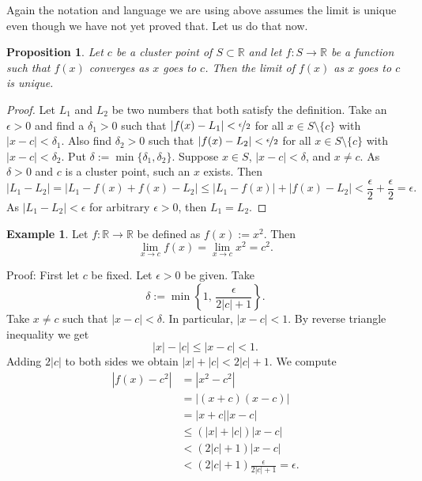 \documentclass[12pt]{book}
\newcommand{\abs}[1]{\left\lvert {#1} \right\rvert}
\newcommand{\R}{{\mathbb{R}}}
\theoremstyle{plain}
\newtheorem{prop}[thm]{Proposition}
\theoremstyle{remark}
\theoremstyle{definition}
\theoremstyle{exercise}
\theoremstyle{example}
\newtheorem{example}[thm]{Example}
\begin{document}
Again the notation and language we are using above assumes the limit
is unique even though we have not yet proved that.
Let us do that now.

\begin{prop}
Let $c$ be a cluster point of $S \subset \R$ and let $f \colon S \to \R$
be a function such that $f(x)$ converges as $x$ goes to $c$.  Then
the limit of $f(x)$ as $x$ goes to $c$ is unique.
\end{prop}

\begin{proof}
Let $L_1$ and $L_2$ be two numbers that both satisfy the definition.
Take an $\epsilon > 0$ and find a $\delta_1 > 0$ such that
$\abs{f(x)-L_1} < \nicefrac{\epsilon}{2}$ 
for all $x \in S \setminus \{c\}$ with $\abs{x-c} < \delta_1$.
Also find $\delta_2 > 0$ such that
$\abs{f(x)-L_2} < \nicefrac{\epsilon}{2}$
for all $x \in S \setminus \{c\}$ with $\abs{x-c} < \delta_2$.
Put $\delta := \min \{ \delta_1, \delta_2 \}$.  Suppose $x \in S$,
$\abs{x-c} < \delta$, and $x \not= c$.  As $\delta > 0$ and $c$ is a cluster
point, such an $x$ exists.  Then
\begin{equation*}
\abs{L_1 - L_2} =
\abs{L_1 - f(x) + f(x) - L_2} \leq
\abs{L_1 - f(x)} + \abs{f(x) - L_2} < \frac{\epsilon}{2} + \frac{\epsilon}{2}
= \epsilon.
\end{equation*}
As $\abs{L_1-L_2} < \epsilon$ for arbitrary $\epsilon > 0$, then
$L_1 = L_2$.
\end{proof}

\begin{example}
Let $f \colon \R \to \R$ be defined as $f(x) := x^2$.  Then
\begin{equation*}
\lim_{x\to c} f(x) = \lim_{x\to c} x^2 = c^2 .
\end{equation*}

Proof: First let $c$ be fixed.  Let $\epsilon > 0$ be given.  Take
\begin{equation*}
\delta := \min \left\{ 1 , \, \frac{\epsilon}{2\abs{c}+1} \right\} .
\end{equation*}
Take $x \not= c$ such that $\abs{x-c} < \delta$.  In particular,
$\abs{x-c} < 1$.  By reverse triangle inequality we get
\begin{equation*}
\abs{x}-\abs{c} \leq \abs{x-c} < 1 .
\end{equation*}
Adding $2\abs{c}$ to both sides we obtain
$\abs{x} + \abs{c} < 2\abs{c} + 1$.  We compute
\begin{equation*}
\begin{split}
\abs{f(x) - c^2} &= \abs{x^2-c^2} \\
&= \abs{(x+c)(x-c)} \\
&= \abs{x+c}\abs{x-c} \\
&\leq (\abs{x}+\abs{c})\abs{x-c} \\
&< (2\abs{c}+1)\abs{x-c} \\
&< (2\abs{c}+1)\frac{\epsilon}{2\abs{c}+1} = \epsilon .
\end{split}
\end{equation*}
\end{example}
\end{document}

